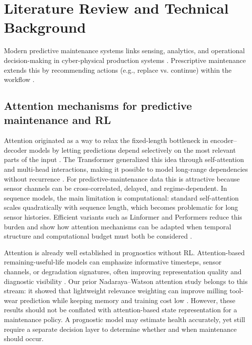 \documentclass[sn-basic]{sn-jnl}%
\begin{document}
\section{Literature Review and Technical Background}
\label{sec:lit_tech}

Modern predictive maintenance systems links sensing, analytics, and operational decision-making in cyber-physical production systems \cite{Compare2020, Zonta2020}. Prescriptive maintenance extends this by recommending actions (e.g., replace vs. continue) within the workflow \cite{Ansari2019}. 

\subsection{Attention mechanisms for predictive maintenance and RL}
Attention originated as a way to relax the fixed-length bottleneck in encoder--decoder models by letting predictions depend selectively on the most relevant parts of the input \cite{Bahdanau2014, Luong2015}. The Transformer generalized this idea through self-attention and multi-head interactions, making it possible to model long-range dependencies without recurrence \cite{Vaswani2017}. For predictive-maintenance data this is attractive because sensor channels can be cross-correlated, delayed, and regime-dependent. In sequence models, the main limitation is computational: standard self-attention scales quadratically with sequence length, which becomes problematic for long sensor histories. Efficient variants such as Linformer and Performers reduce this burden and show how attention mechanisms can be adapted when temporal structure and computational budget must both be considered \cite{Wang2020Linformer, Choromanski2020}.

Attention is already well established in prognostics without RL. Attention-based remaining-useful-life models can emphasize informative timesteps, sensor channels, or degradation signatures, often improving representation quality and diagnostic visibility \cite{Chen2020, Chen2021, Costa2023}. Our prior Nadaraya--Watson attention study belongs to this stream: it showed that lightweight relevance weighting can improve milling tool-wear prediction while keeping memory and training cost low \cite{Siraskar2024}. However, these results should not be conflated with attention-based state representation for a maintenance policy. A prognostic model may estimate health accurately, yet still require a separate decision layer to determine whether and when maintenance should occur.
\end{document}
